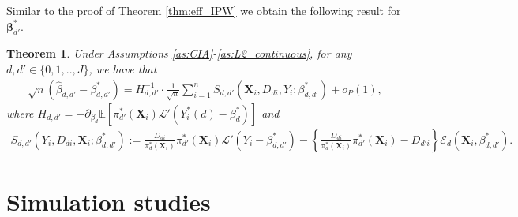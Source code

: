 \documentclass[11pt]{article}
\newtheorem{theorem}[thm]{Theorem}
\numberwithin{equation}{section}
\begin{document}
Similar to the proof of Theorem \ref{thm:eff_IPW} we obtain the following result for $\boldsymbol{\beta}_{d'}^*$.
\begin{theorem}\label{thm:att}
	Under Assumptions \ref{as:CIA}-\ref{as:L2_continuous}, for any $d,d'\in\{0,1,..,J\}$, we have that
	\begin{align*}
		\sqrt{n}(\widehat{\beta}_{d,d'}-\beta^*_{d,d'})=H_{d,d'}^{-1}\cdot\frac{1}{\sqrt{n}}\sum_{i=1}^nS_{d,d'}(\boldsymbol{X}_{i},D_{di},Y_i;\beta_{d,d'}^*)+o_P(1),
	\end{align*}
	where $H_{d,d'}=-\partial_{\beta_d}\mathbb{E}[\pi_{d'}^*(\boldsymbol{X}_{i})\mathcal{L}'(Y_i^*(d)-\beta_d^*)]$ and
	\begin{align*}
		S_{d,d'}(Y_i,D_{di},\boldsymbol{X}_{i};\beta_{d,d'}^*):= \frac{D_{di}}{{\pi}^*_d(\boldsymbol{X}_{i})}{\pi}^*_{d'}(\boldsymbol{X}_{i})
\mathcal{L}'(Y_i-\beta_{d,d'}^*)-\left\{\frac{D_{di}}
{\pi_d^*(\boldsymbol{X}_{i})}\pi^*_{d'}(\boldsymbol{X}_{i})-D_{d'i}\right\}
\mathcal{E}_{d}(\boldsymbol{X}_{i},\beta_{d,d'}^*).
	\end{align*}
\end{theorem}



\section{Simulation studies}\label{sec:simulation}
\end{document}
